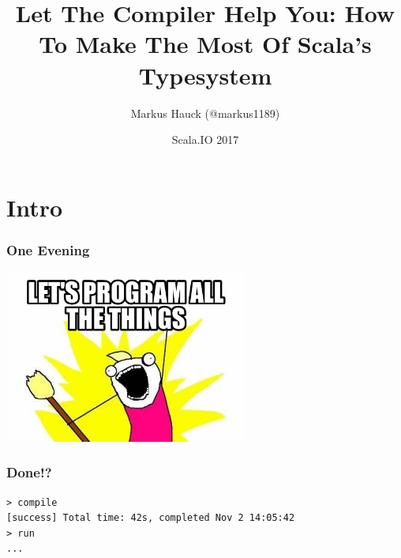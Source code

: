 \documentclass{beamer}
\title{Let The Compiler Help You: How To Make The Most Of Scala's Typesystem}
\author{Markus Hauck (@markus1189)}
\date{Scala.IO 2017}
\begin{document}
{
  \frame[plain]{\titlepage}
}

\section{Intro}
\label{sec:intro}

\begin{frame}
  \begin{center}
    \frametitle{One Evening}
    \includegraphics[width=0.6\textwidth]{../pics/lets-program.png}
  \end{center}
\end{frame}

\begin{frame}[fragile]
  \frametitle{Done!?}
\begin{verbatim}
> compile
[success] Total time: 42s, completed Nov 2 14:05:42
> run
...
\end{verbatim}
\end{frame}
\end{document}
